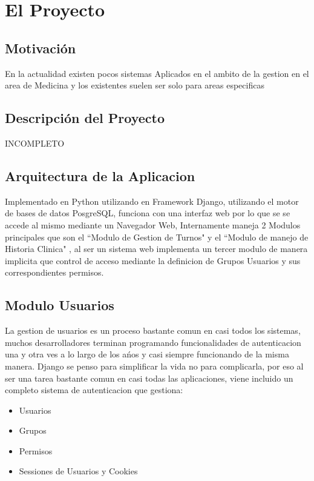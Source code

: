 \chapter{El Proyecto}

\section{Motivación}

En la actualidad existen pocos sistemas Aplicados en el ambito de la gestion en
el area de Medicina y los existentes suelen ser solo para areas especificas

\section{Descripci\'on del Proyecto}
INCOMPLETO


\section{Arquitectura de la Aplicacion}

Implementado en Python utilizando en Framework Django, utilizando el motor de bases
de datos PosgreSQL, funciona con una interfaz web por lo que se se accede al
mismo mediante un Navegador Web, Internamente maneja 2 Modulos principales
que son el  ``Modulo de Gestion de Turnos" y el ``Modulo de manejo de
Historia Clinica" , al ser un sistema web implementa un tercer modulo de manera
implicita que control de acceso mediante la definicion de Grupos Usuarios y
sus correspondientes permisos.

\section{Modulo Usuarios}

La gestion de usuarios es un proceso bastante comun en casi todos los sistemas,
muchos desarrolladores terminan programando funcionalidades de autenticacion 
una y otra ves a lo largo de los a\'nos y casi siempre funcionando de la misma 
manera. Django se penso para simplificar la vida no para complicarla, por eso
al ser una tarea bastante comun en casi todas las aplicaciones, viene incluido
un completo sistema de autenticacion que gestiona:

\begin{itemize}
    \item Usuarios
    \item Grupos
    \item Permisos
    \item Sessiones de Usuarios y Cookies
\end{itemize}


